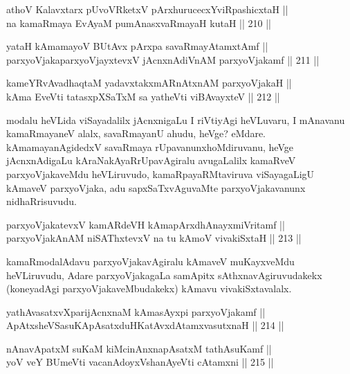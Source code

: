 
\begin{shl}
athoV Kalavxtarx pUvoVRketxV pArxhurucecxYviRpashicxtaH || \\
na kamaRmaya EvAyaM pumAnasxvaRmayaH kutaH \hfill || 210 ||  
\end{shl}

\begin{shl}
yataH kAmamayoV BUtAvx pArxpa savaRmayAtamxtAmf || \\
parxyoVjakaparxyoVjayxtevxV jAcnxnAdiVnAM parxyoVjakamf \hfill || 211 ||  
\end{shl}

\begin{shl}
kameYRvAvadhaqtaM yadavxtakxmARnAtxnAM parxyoVjakaH || \\
kAma EveVti tatasxpXSaTxM sa yatheVti viBAvayxteV \hfill || 212 ||  
\end{shl}

\begin{artha}
modalu heVLida viSayadalilx jAcnxnigaLu I riVtiyAgi heVLuvaru, I
mAnavanu kamaRmayaneV alalx, savaRmayanU ahudu, heVge?
eMdare. kAmamayanAgidedxV savaRmaya rUpavanunx\break hoMdiruvanu, heVge
jAcnxnAdigaLu kAraNakAyaRrUpavAgiralu avugaLalilx kamaRveV
parxyoVjakaveMdu heVLiruvudo, kamaR\-\break payaRMtaviruva viSayagaLigU
kAmaveV parxyoVjaka, adu sapxSaTxvAguvaMte parxyoVjakavanunx
nidhaRrisuvudu.
\end{artha}

\begin{shl}
parxyoVjakatevxV kamARdeVH kAmapArxdhAnayxmiVritamf || \\
parxyoVjakAnAM niSAThxtevxV na tu kAmoV vivakiSxtaH \hfill || 213 ||  
\end{shl}

\begin{artha}
kamaRmodalAdavu parxyoVjakavAgiralu kAmaveV muKayxveMdu heVLiruvudu,
Adare parxyoVjakagaLa samApitx sAthxnavAgiruvudakekx (koneyadAgi
parxyoVjakaveMbudakekx) kAmavu vivakiSxtavalalx.
\end{artha}

\begin{shl}
yathAvasatxvXparijAcnxnaM kAmasAyxpi parxyoVjakamf ||  \\
ApAtxsheVSasuKApAsatxduHKatAvxdAtamxvasutxnaH \hfill || 214 ||  
\end{shl}

\begin{shl}
nAnavApatxM suKaM kiMcinAnxnapAsatxM tathA\s suKamf || \\
yoV veY BUmeVti vacanAdoyxV\s shanAyeVti cA\s \s tamxni \hfill || 215 ||  
\end{shl}

